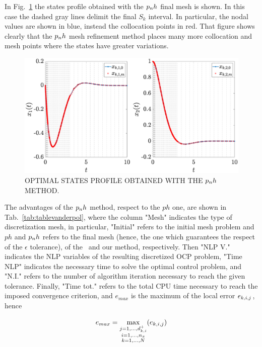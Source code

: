 In Fig.~\ref{fig:vanderpolstates} the states profile obtained with the $p_{n}h$ final mesh is shown. In this case the dashed gray lines delimit the final $S_k$ interval. In particular, the nodal values are shown in blue, instead the collocation points in red. That figure shows clearly that the $p_{n}h$ mesh refinement method places many more collocation and mesh points where the states have greater variations.


\begin{figure}
	\centering
	\includegraphics[trim={2cm 0cm 4cm 0cm},clip,width=1.\linewidth]{Img/vanderpol_states}
	\caption{OPTIMAL STATES PROFILE OBTAINED WITH THE $p_{n}h$ METHOD.}
	\label{fig:vanderpolstates}
\end{figure}

The advantages of the $p_{n}h$ method, respect to the $ph$ one, are shown in Tab.~\ref{tab:tablevanderpol}, where the column "Mesh" indicates the type of discretization mesh, in particular, "Initial" refers to the initial mesh problem and $ph$ and $p_{n}h$ refers to the final mesh (hence, the one which guarantees the respect of the $\epsilon$ tolerance), of the~\cite{Patterson:OCAM:2015} and our method, respectively. Then "NLP V." indicates the NLP variables of the resulting discretized OCP problem, "Time NLP" indicates the necessary time to solve the optimal control problem, and "N.I." refers to the number of algorithm iteration necessary to reach the given tolerance. Finally, "Time tot." refers to the total CPU time necessary to reach the imposed convergence criterion, and $e_{max}$  is the maximum of the local error $e_{k,i,j}$, hence

\begin{equation}
e_{max}= \max\limits_{\substack{j = 1, \dots, d_{k,i}^{+} \\ i = 1, \dots, n_x \\ k = 1, \dots, N}} (e_{k,i,j})
\end{equation}


